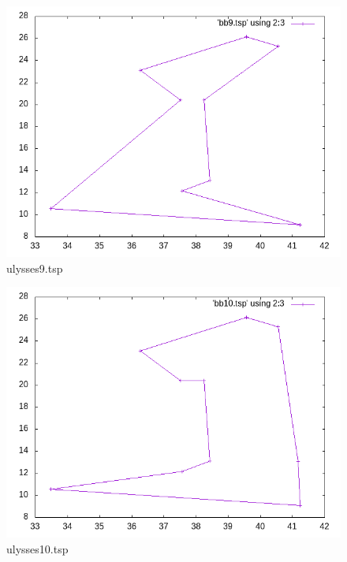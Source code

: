 \documentclass[12pt,spanish]{article}
\begin{document}
\begin{figure}[H]
\centering
\includegraphics[scale=0.75]{bb9.png}
\caption{ulysses9.tsp}
\end{figure}

\begin{figure}[H]
\centering
\includegraphics[scale=0.75]{bb10.png}
\caption{ulysses10.tsp}
\end{figure}
\end{document}
